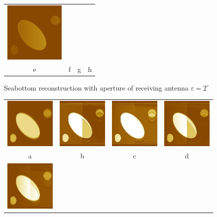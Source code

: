\documentclass{procDDs}
\begin{document}
\begin{figure}[h!]
\begin{tabular}{cccc}
		\includegraphics[width=0.2\linewidth]{k-img-6-9.jpg}\\
		e & f & g & h \\
	\end{tabular}
	\caption{Seabottom reconstruction with aperture of receiving antenna $\varepsilon=2^\circ$ }
\end{figure}
\begin{figure}[h!]\center%
	\begin{tabular}{cccc}
		\includegraphics[width=0.2\linewidth]{k-img-7-1.jpg}&
		\includegraphics[width=0.2\linewidth]{k-img-7-3.jpg}&
		\includegraphics[width=0.2\linewidth]{k-img-7-4.jpg}&
		\includegraphics[width=0.2\linewidth]{k-img-7-5.jpg}\\
		a & b & c & d\\
		\includegraphics[width=0.2\linewidth]{k-img-7-6.jpg}&

\end{tabular}
\end{figure}
\end{document}
